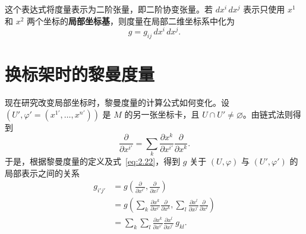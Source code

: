 这个表达式将度量表示为二阶张量，即二阶协变张量。若 $dx^i\,dx^j$ 表示只使用 $x^1$ 和 $x^2$ 两个坐标的\textbf{局部坐标基}，则度量在局部二维坐标系中化为
\begin{equation*}
  g=g_{ij}\,dx^i\,dx^j.
  \tag{2.21}\label{eq:2.21}
\end{equation*}

\section{换标架时的黎曼度量}
现在研究改变局部坐标时，黎曼度量的计算公式如何变化。设 $(U',\varphi'=(x^{1'},\ldots,x^{n'}))$ 是 $M$ 的另一张坐标卡，且 $U\cap U'\neq\varnothing$。由链式法则得到
\begin{equation*}
  \frac{\partial}{\partial x^{i'}}
  =\sum_k \frac{\partial x^k}{\partial x^{i'}}\frac{\partial}{\partial x^k}.
  \tag{2.22}\label{eq:2.22}
\end{equation*}
于是，根据黎曼度量的定义及式~\eqref{eq:2.22}，得到 $g$ 关于 $(U,\varphi)$ 与 $(U',\varphi')$ 的局部表示之间的关系
\begin{equation*}
  \begin{aligned}
    g_{i'j'}&=g\!\left(\frac{\partial}{\partial x^{i'}},\frac{\partial}{\partial x^{j'}}\right)\\
    &=g\!\left(\sum_k\frac{\partial x^k}{\partial x^{i'}}\frac{\partial}{\partial x^k},
         \sum_l\frac{\partial x^l}{\partial x^{j'}}\frac{\partial}{\partial x^l}\right)\\
    &=\sum_k\sum_l\frac{\partial x^k}{\partial x^{i'}}\frac{\partial x^l}{\partial x^{j'}}\,g_{kl}.
  \end{aligned}
  \tag{2.23}\label{eq:2.23}
\end{equation*}

